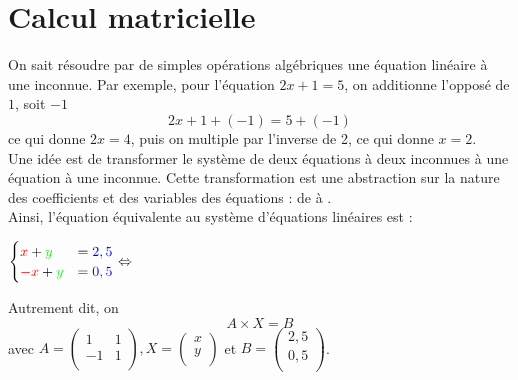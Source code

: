 \documentclass{book}
\begin{document}
\section{Calcul matricielle}
On sait résoudre par de simples opérations algébriques une équation linéaire à une inconnue. Par exemple, pour l'équation $2x+1=5$, on additionne l'opposé de $1$, soit $-1$ $$2x+1+(-1)=5+(-1)$$ ce qui donne $2x=4$, puis on multiple par l'inverse de 2, ce qui donne $x=2$.\\
Une idée est de transformer le système de deux équations à deux inconnues à une équation à une inconnue. Cette transformation est une abstraction sur la nature des coefficients et des variables des équations : de  à  .\\
Ainsi, l'équation équivalente au système d'équations linéaires est  :
\begin{center}
$\begin{cases}
{\color{red}x}+{\color{green}y}&={\color{blue}2,5}\\
{\color{red}-x}+{\color{green}y}&={\color{blue}0,5}
\end{cases}\Leftrightarrow
$	
\end{center}
Autrement dit, on $$A\times X =B$$ avec $A=\begin{pmatrix}
 1 & 1   \\
 -1 & 1  \\
\end{pmatrix}, X=\begin{pmatrix}
 x   \\
 y  \\
\end{pmatrix}$ et $B=\begin{pmatrix}
 2,5   \\
 0,5  \\
\end{pmatrix}$.\\
\end{document}
